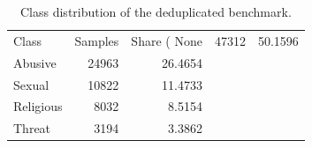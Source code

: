\begin{table}
\caption{Class distribution of the deduplicated benchmark.}
\label{tab:class_distribution}
\begin{tabular}{lrr}
\toprule
Class & Samples & Share (%
\midrule
None & 47312 & 50.1596 \\
Abusive & 24963 & 26.4654 \\
Sexual & 10822 & 11.4733 \\
Religious & 8032 & 8.5154 \\
Threat & 3194 & 3.3862 \\
\bottomrule
\end{tabular}
\end{table}
